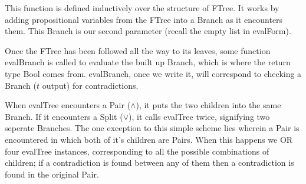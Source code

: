 \documentclass[11pt]{article}
\begin{document}
This function is defined inductively over the structure of FTree. It works by adding propositional variables from the FTree into a Branch as it encounters them. This Branch is our second parameter (recall the empty list in evalForm). 

Once the FTree has been followed all the way to its leaves, some function evalBranch is called to evaluate the built up Branch, which is where the return type Bool comes from. evalBranch, once we write it, will correspond to checking a Branch ($t$ output) for contradictions.

When evalTree encounters a Pair ($\land$), it puts the two children into the same Branch. If it encounters a Split ($\lor$), it calls evalTree twice, signifying two seperate Branches. The one exception to this simple scheme lies wherein a Pair is encountered in which both of it's children are Pairs. When this happens we OR four evalTree instances, corresponding to all the possible combinations of children; if a contradiction is found between any of them then a contradiction is found in the original Pair.
\end{document}
